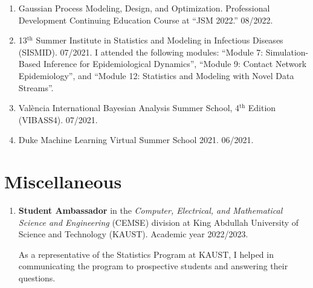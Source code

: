 \documentclass[10pt, ]{article}
\begin{document}
\begin{enumerate}[noitemsep, topsep=0pt]
		\item Gaussian Process Modeling, Design, and Optimization. Professional Development Continuing Education Course at ``JSM 2022.'' 08/2022.
		
		\item 13${}^{\text{th}}$ Summer Institute in Statistics and Modeling in Infectious Diseases (SISMID). 07/2021. I attended the following modules: ``Module 7: Simulation-Based Inference for Epidemiological Dynamics'', ``Module 9: Contact Network Epidemiology'', and ``Module 12: Statistics and Modeling with Novel Data Streams''.
		
		\item València International Bayesian Analysis Summer School, 4${}^{\text{th}}$ Edition (VIBASS4). 07/2021.
		
		\item Duke Machine Learning Virtual Summer School 2021. 06/2021.
	\end{enumerate}
	
	\vspace{10pt}

	\vspace{-12pt}
	\section*{Miscellaneous} \vspace{-5pt}
	
	\begin{enumerate}[noitemsep, topsep=0pt]
		\item \textbf{Student Ambassador} in the\textit{ Computer, Electrical,  and Mathematical Science and Engineering} (CEMSE) division at King Abdullah University of Science and Technology (KAUST). Academic year 2022/2023.
		
		As a representative of the Statistics Program at KAUST, I helped in communicating the program to prospective students and answering their questions.
	\end{enumerate}
	
\end{document}
